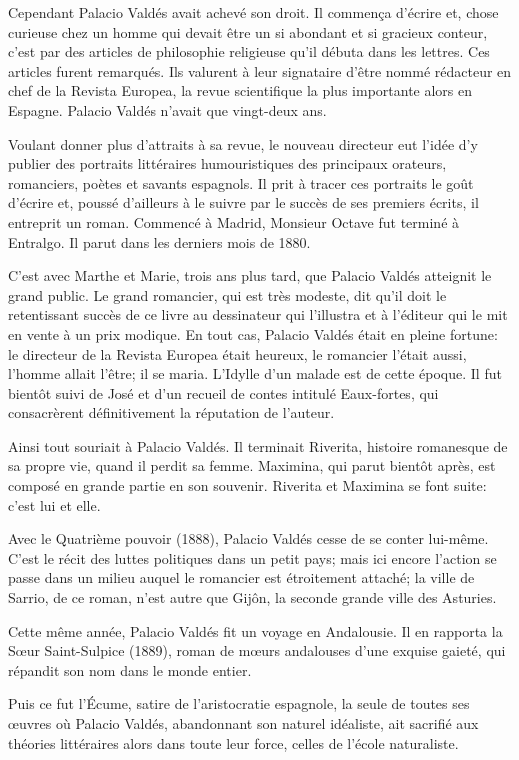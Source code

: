\horizontalLine

Cependant Palacio Valdés avait achevé son droit. Il commença d'écrire
et, chose curieuse chez un homme qui devait être un si abondant et si
gracieux conteur, c'est par des articles de philosophie religieuse qu'il
débuta dans les lettres. Ces articles furent remarqués. Ils valurent à
leur signataire d'être nommé rédacteur en chef de la Revista Europea,
la revue scientifique la plus importante alors en Espagne. Palacio
Valdés n'avait que vingt-deux ans.

Voulant donner plus d'attraits à sa revue, le nouveau directeur eut
l'idée d'y publier des portraits littéraires humouristiques des
principaux orateurs, romanciers, poètes et savants espagnols. Il prit à
tracer ces portraits le goût d'écrire et, poussé d'ailleurs à le suivre
par le succès de ses premiers écrits, il entreprit un roman. Commencé à
Madrid, Monsieur Octave fut terminé à Entralgo. Il parut dans les
derniers mois de 1880.

C'est avec Marthe et Marie, trois ans plus tard, que Palacio Valdés
atteignit le grand public. Le grand romancier, qui est très modeste, dit
qu'il doit le retentissant succès de ce livre au dessinateur qui
l'illustra et à l'éditeur qui le mit en vente à un prix modique. En tout
cas, Palacio Valdés était en pleine fortune: le directeur de la Revista
Europea était heureux, le romancier l'était aussi, l'homme allait
l'être; il se maria. L'Idylle d'un malade est de cette époque. Il fut
bientôt suivi de José et d'un recueil de contes intitulé
Eaux-fortes, qui consacrèrent définitivement la réputation de
l'auteur.

Ainsi tout souriait à Palacio Valdés. Il terminait Riverita, histoire
romanesque de sa propre vie, quand il perdit sa femme. Maximina, qui
parut bientôt après, est composé en grande partie en son souvenir.
Riverita et Maximina se font suite: c'est lui et elle.

Avec le Quatrième pouvoir (1888), Palacio Valdés cesse de se conter
lui-même. C'est le récit des luttes politiques dans un petit pays; mais
ici encore l'action se passe dans un milieu auquel le romancier est
étroitement attaché; la ville de Sarrio, de ce roman, n'est autre que
Gijôn, la seconde grande ville des Asturies.

Cette même année, Palacio Valdés fit un voyage en Andalousie. Il en
rapporta la Sœur Saint-Sulpice (1889), roman de mœurs andalouses
d'une exquise gaieté, qui répandit son nom dans le monde entier.

Puis ce fut l'Écume, satire de l'aristocratie espagnole, la seule de
toutes ses œuvres où Palacio Valdés, abandonnant son naturel
idéaliste, ait sacrifié aux théories littéraires alors dans toute leur
force, celles de l'école naturaliste.


